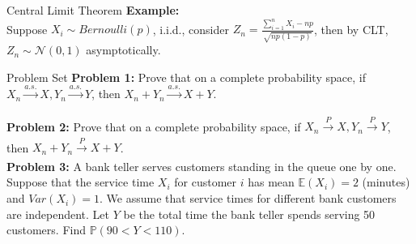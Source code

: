 \documentclass [aspectratio=169]{beamer}
\newcommand{\mc}{\mathcal}
\begin{document}
\begin{frame}{Central Limit Theorem}
\textbf{Example:}\\
Suppose $X_i \sim Bernoulli(p)$, i.i.d.,  consider $Z_n = \frac{\sum_{i=1}^n {X_i} - np}{\sqrt{np(1-p)}}$, then by CLT, $Z_n \sim \mc{N}(0,1)$ asymptotically. 
\vspace{1in}

\end{frame}




\begin{frame}{Problem Set}
    \textbf{Problem 1:}  Prove that on a complete probability space, if $X_n  \xrightarrow[]{a.s.} X, Y_n  \xrightarrow[]{a.s.} Y$, then $X_n + Y_n \xrightarrow[]{a.s.} X+Y$.\\
    \vspace{0.1in}
    
     \textbf{Problem 2:} Prove that on a complete probability space, if $X_n  \xrightarrow[]{P} X, Y_n  \xrightarrow[]{P} Y$, then $X_n + Y_n \xrightarrow[]{P} X+Y$.
    \vspace{0.1in}\\
    
    \textbf{Problem 3:} A bank teller serves customers standing in the queue one by one. Suppose that the service time $X_i$ for customer $i$ has mean $\mathbb{E}(X_i) = 2$ (minutes) and $Var(X_i) = 1$. We assume that service times for different bank customers are independent. Let $Y$ be the total time the bank teller spends serving 50 customers. Find $\mathbb{P}(90<Y<110)$.
    \vspace{0.1in}\\
   
\end{frame}
\end{document}
